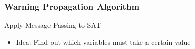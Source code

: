 \begin{frame}
	\frametitle{Warning Propagation Algorithm}
	Apply Message Passing to SAT
	\begin{itemize}
		\item Idea: Find out which variables must take a certain value
	\end{itemize}

		
\end{frame}